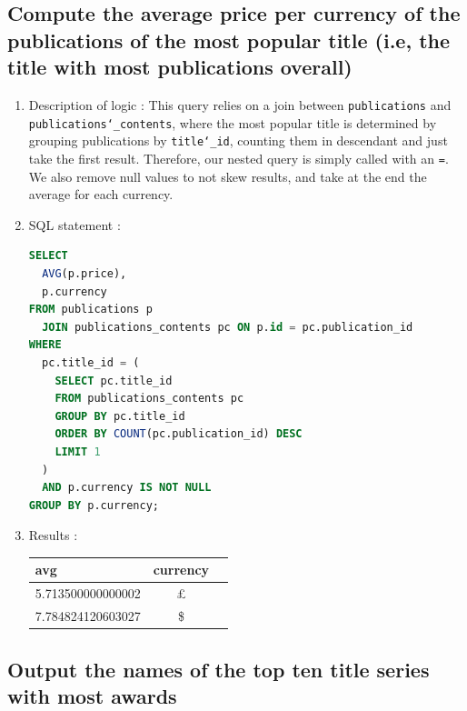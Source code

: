 \documentclass[doubleside, titlepage]{article}
\begin{document}
\subsection{Compute the average price per currency of the publications of the most popular title (i.e, the title with most publications overall)}
	\begin{enumerate}
	\item Description of logic : This query relies on a join between \texttt{publications} and \texttt{publications\char`_contents}, where the most popular title is determined by grouping publications by \texttt{title\char`_id}, counting them in descendant and just take the first result. Therefore, our nested query is simply called with an \texttt{=}. We also remove null values to not skew results, and take at the end the average for each currency.
	\item SQL statement :
		\begin{lstlisting}[language=SQL,showspaces=false,basicstyle=\ttfamily,numberstyle=\tiny,commentstyle=\color{gray}]
SELECT
  AVG(p.price),
  p.currency
FROM publications p
  JOIN publications_contents pc ON p.id = pc.publication_id
WHERE
  pc.title_id = (
    SELECT pc.title_id
    FROM publications_contents pc
    GROUP BY pc.title_id
    ORDER BY COUNT(pc.publication_id) DESC
    LIMIT 1
  )
  AND p.currency IS NOT NULL
GROUP BY p.currency;
		\end{lstlisting}

	\item Results :\\

	\begin{tabular}{|l|c|r|}
  \hline
  avg & currency \\
  \hline
5.713500000000002	& \pounds \\
7.784824120603027	& \$ \\
\hline
\end{tabular}

	\end{enumerate}


\subsection{Output the names of the top ten title series with most awards}
\end{document}
